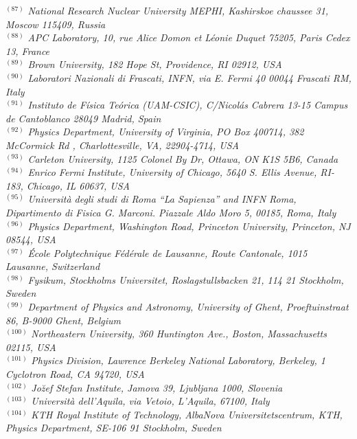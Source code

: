 {\begin{center}
$^{(87)}$ \emph{National Research Nuclear University MEPHI,  Kashirskoe chaussee 31, Moscow 115409, Russia}\\
$^{(88)}$ \emph{APC Laboratory, 10, rue Alice Domon et L\'eonie Duquet 75205, Paris Cedex 13, France}\\
$^{(89)}$ \emph{Brown University, 182 Hope St, Providence, RI 02912, USA}\\
$^{(90)}$ \emph{Laboratori Nazionali di Frascati, INFN, via E. Fermi 40 00044 Frascati RM, Italy}\\
$^{(91)}$ \emph{Instituto de F\'isica Te\'orica (UAM-CSIC), C/Nicol\'as Cabrera 13-15 Campus de Cantoblanco 28049 Madrid, Spain}\\
$^{(92)}$ \emph{Physics Department, University of Virginia,  PO Box 400714, 382 McCormick Rd ,  Charlottesville, VA, 22904-4714, USA}\\
$^{(93)}$ \emph{Carleton University, 1125 Colonel By Dr, Ottawa, ON K1S 5B6, Canada}\\
$^{(94)}$ \emph{Enrico Fermi Institute, University of Chicago, 5640 S. Ellis Avenue, RI-183, Chicago, IL 60637, USA}\\
$^{(95)}$ \emph{Universit\`a degli studi di Roma ``La Sapienza'' and INFN Roma, Dipartimento di Fisica G. Marconi. Piazzale Aldo Moro 5, 00185, Roma, Italy}\\
$^{(96)}$ \emph{Physics Department, Washington Road, Princeton University, Princeton, NJ 08544, USA}\\
$^{(97)}$ \emph{\'Ecole Polytechnique F\'ed\'erale de Lausanne, Route Cantonale, 1015 Lausanne, Switzerland}\\
$^{(98)}$ \emph{Fysikum, Stockholms Universitet, Roslagstullsbacken 21, 114 21 Stockholm, Sweden}\\
$^{(99)}$ \emph{Department of Physics and Astronomy, University of Ghent, Proeftuinstraat 86, B-9000 Ghent, Belgium}\\
$^{(100)}$ \emph{Northeastern University, 360 Huntington Ave., Boston, Massachusetts 02115, USA}\\
$^{(101)}$ \emph{Physics Division, Lawrence Berkeley National Laboratory, Berkeley, 1 Cyclotron Road, CA 94720, USA}\\
$^{(102)}$ \emph{Jo\u zef Stefan Institute, Jamova 39, Ljubljana 1000, Slovenia}\\
$^{(103)}$ \emph{Universit\`a dell'Aquila, via Vetoio, L'Aquila, 67100, Italy}\\
$^{(104)}$ \emph{KTH Royal Institute of Technology, AlbaNova Universitetscentrum, KTH, Physics Department, SE-106 91 Stockholm, Sweden}\\

\end{center}}
